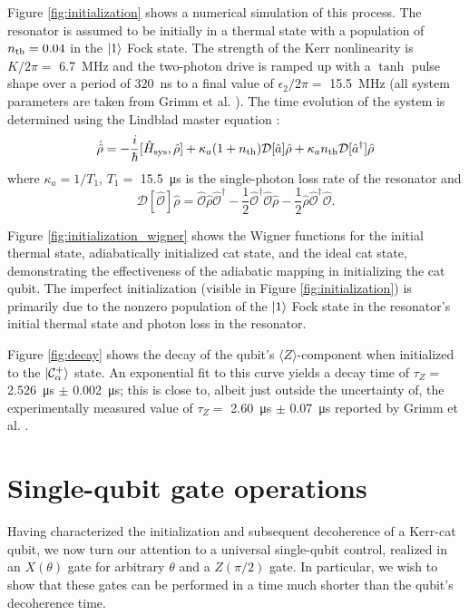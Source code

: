 Figure \ref{fig:initialization} shows a numerical simulation of this process.
The resonator is assumed to be initially in a thermal state with a population of $n_{\rm th} = 0.04$ in the $\ket{1}$ Fock state.
The strength of the Kerr nonlinearity is $K / 2\pi =$ \SI{6.7}{\MHz} and the two-photon drive is ramped up with a $\tanh$ pulse shape over a period of \SI{320}{\ns} to a final value of $\epsilon_2 / 2 \pi =$ \SI{15.5}{\MHz} (all system parameters are taken from Grimm et al. \cite{grimm_2020}).
The time evolution of the system is determined using the Lindblad master equation \cite{manzano_2020}:
\[
    \dot{\hat{\rho}} = - \frac {i} {\hbar} [\hat{H}_{\rm sys}, \hat{\rho}] + \kappa_a (1 + n_{\rm th}) \mathcal{D}[\hat{a}] \hat{\rho} + \kappa_a n_{\rm th} \mathcal{D}[\hat{a}^\dag] \hat{\rho}
\]
where $\kappa_a = 1/T_1$, $T_1 =$ \SI{15.5}{\micro\s} is the single-photon loss rate of the resonator and
\[
    \mathcal{D}[\hat{\mathcal{O}}] \hat{\rho} = \hat{\mathcal{O}} \hat{\rho} \hat{\mathcal{O}}^\dag - \frac {1} {2} \hat{\mathcal{O}}^\dag \hat{\mathcal{O}} \hat{\rho} - \frac {1} {2} \hat{\rho} \hat{\mathcal{O}}^\dag \hat{\mathcal{O}}.
\]

Figure \ref{fig:initialization_wigner} shows the Wigner functions for the initial thermal state, adiabatically initialized cat state, and the ideal cat state, demonstrating the effectiveness of the adiabatic mapping in initializing the cat qubit.
The imperfect initialization (visible in Figure \ref{fig:initialization}) is primarily due to the nonzero population of the $\ket{1}$ Fock state in the resonator's initial thermal state and photon loss in the resonator.

Figure \ref{fig:decay} shows the decay of the qubit's $\langle Z \rangle$-component when initialized to the $\ket{\mathcal{C}_\alpha^+}$ state.
An exponential fit to this curve yields a decay time of $\tau_Z =$ \SI{2.526}{\micro\s} $\pm$ \SI{0.002}{\micro\s}; this is close to, albeit just outside the uncertainty of, the experimentally measured value of $\tau_Z =$ \SI{2.60}{\micro\s} $\pm$ \SI{0.07}{\micro\s} reported by Grimm et al. \cite{grimm_2020}.

\section{\label{sec:gates} Single-qubit gate operations}

Having characterized the initialization and subsequent decoherence of a Kerr-cat qubit, we now turn our attention to a universal single-qubit control, realized in an $X(\theta)$ gate for arbitrary $\theta$ and a $Z(\pi/2)$ gate.
In particular, we wish to show that these gates can be performed in a time much shorter than the qubit's decoherence time.

